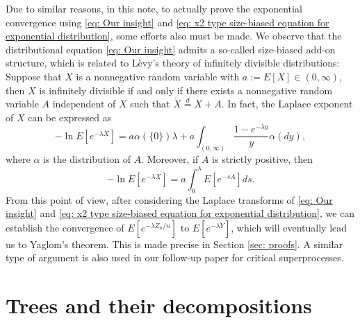 \documentclass[12pt,a4paper]{amsart}
\numberwithin{equation}{section}
\begin{document}
	Due to similar reasons, in this note,
	to actually prove the exponential convergence using \eqref{eq: Our insight} and \eqref{eq: x2 type size-biased equation for exponential distribution}, some efforts also must be made.
	We observe that the distributional equation \eqref{eq: Our insight} admits
    a so-called size-biased add-on structure, which is related to L\`evy's
	theory of infinitely divisible distributions: Suppose that $X$ is a nonnegative random variable with $ a := E [X]\in (0,\infty)$,
	then $X$ is infinitely divisible if and only if there exists a nonnegative random variable $A$ independent of $X$ such that $\dot X 	\overset{d} = X + A$.
	In fact,
	the Laplace exponent of $X$ can be expressed as
\[
	-\ln E[ e^{-\lambda X}]
	 =  a \alpha(\{0\}) \lambda+ a \int_{(0,\infty)} \frac{1 - e^{-\lambda y}}{y} \alpha(dy),
\]
	where $\alpha$ is the distribution of $A$.
	Moreover, if $A$ is strictly positive, then
\begin{equation}\label{eq: Laplace exponent for size-biased add-on equation}
	-\ln E[ e^{-\lambda X}]
	=  a  \int_0^\lambda E [e^{-s A}] ds.
\end{equation}
	From this point of view, after considering the Laplace transforms of 
	\eqref{eq: Our insight} and \eqref{eq: x2 type size-biased equation for exponential distribution}, we can establish the convergence of $E[e^{-\lambda \dot Z_n/n}]$ to $E[e^{-\lambda \dot {Y}}]$, which will eventually lead us to Yaglom's theorem.
	This is made precise in Section \ref{sec: proofs}.
	A similar type of argument is also  used in our
	follow-up
	paper \cite{RenSongSun2017Spine} for critical superprocesses.
	
\section{Trees and their decompositions}
\label{sec:preliminary}
\end{document}

